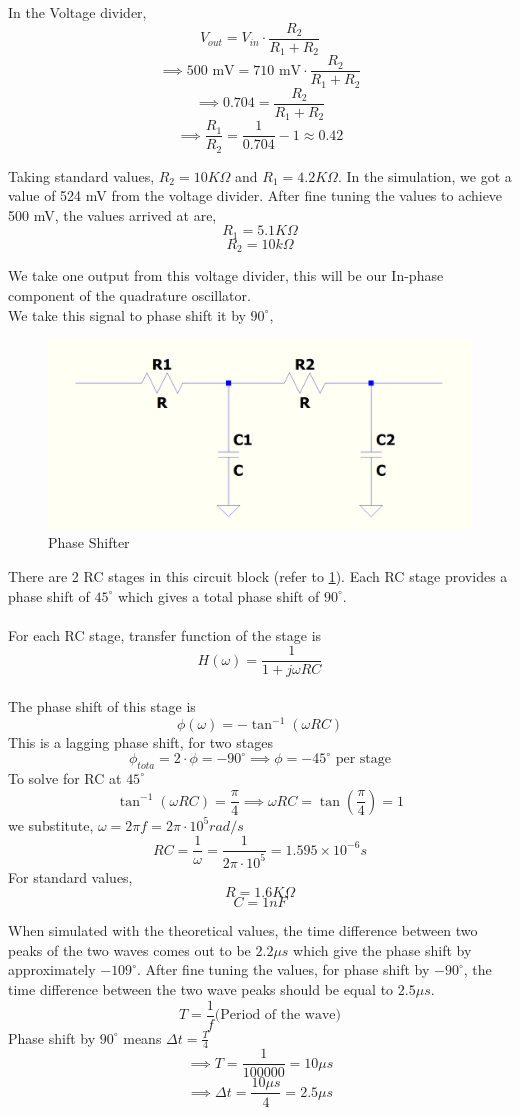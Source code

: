 In the Voltage divider,
$$V_{out} = V_{in}\cdot \frac{R_2}{R_1 + R_2}$$
$$\implies 500\text{ mV} = 710 \text{ mV} \cdot \frac{R_2}{R_1 + R_2}$$
$$\implies 0.704 = \frac{R_2}{R_1 + R_2}$$
$$\implies \frac{R_1}{R_2} = \frac{1}{0.704} - 1 \approx 0.42$$

Taking standard values, $R_2 = 10K\Omega$ and $R_1 = 4.2K\Omega$.
In the simulation, we got a value of 524 mV from the voltage divider. After fine tuning the values to achieve 500 mV, the values arrived at are,
$$R_1 = 5.1K\Omega$$
$$R_2 = 10k\Omega$$

We take one output from this voltage divider, this will be our In-phase component of the quadrature oscillator.\\
We take this signal to phase shift it by $90^\circ$, 

\begin{figure}[H]
    \centering
    \includegraphics[width=0.8\linewidth]{Phase-shift.png}
    \caption{Phase Shifter}
    \label{fig:phase-shift}
\end{figure}

There are 2 RC stages in this circuit block (refer to \cref{fig:phase-shift}). Each RC stage provides a phase shift of $45^\circ$ which gives a total phase shift of $90^\circ$.
\\
\\
For each RC stage, transfer function of the stage is
$$H(\omega) = \frac{1}{ 1 + j\omega RC}$$\\
The phase shift of this stage is 
$$\phi(\omega) = -\tan^{-1}(\omega RC)$$
This is a lagging phase shift, for two stages
$$\phi_{tota} = 2 \cdot \phi = -90^\circ \implies \phi = -45^\circ \text{ per stage}$$
To solve for RC at $45^\circ$
$$\tan^{-1}(\omega RC) = \frac{\pi}{4} \implies \omega RC = \tan(\frac{\pi}{4}) = 1$$
we substitute, $\omega = 2\pi f = 2\pi \cdot 10^5 rad/s$
$$RC = \frac{1}{\omega} = \frac{1}{2\pi \cdot 10^5} = 1.595 \times 10^{-6}s$$
For standard values,
$$R = 1.6K\Omega$$
$$C = 1nF$$

When simulated with the theoretical values, the time difference between two peaks of the two waves comes out to be $2.2 \mu s$ which give the phase shift by approximately $-109^\circ$. After fine tuning the values, for phase shift by $-90^\circ$, the time difference between the two wave peaks should be equal to $2.5 \mu s$.
$$T = \frac{1}{f} \text{(Period of the wave)}$$
Phase shift by $90^\circ$ means $\Delta t = \frac{T}{4}$
$$\implies T = \frac{1}{100000} = 10 \mu s$$
$$\implies \Delta t = \frac{10 \mu s}{4} = 2.5 \mu s$$


